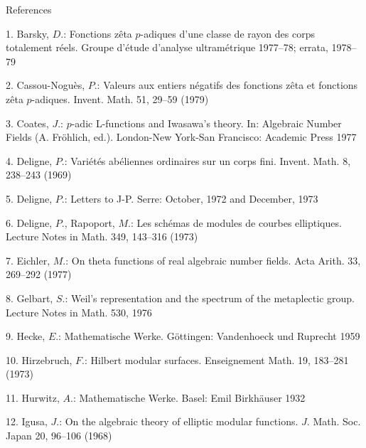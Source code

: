 \documentclass[11pt]{article}
\begin{document}
\par
\begingroup\small\setlength{\parskip}{.15\baselineskip}
References\par
\par
1. Barsky, \(D\).: Fonctions zêta \(p\)-adiques d’une classe de rayon des corps totalement réels. Groupe d’étude d’analyse ultramétrique 1977--78; errata, 1978--79\par
\par
2. Cassou-Noguès, \(P\).: Valeurs aux entiers négatifs des fonctions zêta et fonctions zêta \(p\)-adiques. Invent. Math. 51, 29--59 (1979)\par
\par
3. Coates, \(J\).: \(p\)-adic L-functions and Iwasawa’s theory. In: Algebraic Number Fields (A. Fröhlich, ed.). London-New York-San Francisco: Academic Press 1977\par
\par
4. Deligne, \(P\).: Variétés abéliennes ordinaires sur un corps fini. Invent. Math. 8, 238--243 (1969)\par
\par
5. Deligne, \(P\).: Letters to J-P. Serre: October, 1972 and December, 1973\par
\par
6. Deligne, \(P\)., Rapoport, \(M\).: Les schémas de modules de courbes elliptiques. Lecture Notes in Math. 349, 143--316 (1973)\par
\par
7. Eichler, \(M\).: On theta functions of real algebraic number fields. Acta Arith. 33, 269--292 (1977)\par
\par
8. Gelbart, \(S\).: Weil’s representation and the spectrum of the metaplectic group. Lecture Notes in Math. 530, 1976\par
\par
9. Hecke, \(E\).: Mathematische Werke. Göttingen: Vandenhoeck und Ruprecht 1959\par
\par
10. Hirzebruch, \(F\).: Hilbert modular surfaces. Enseignement Math. 19, 183--281 (1973)\par
\par
11. Hurwitz, \(A\).: Mathematische Werke. Basel: Emil Birkhäuser 1932\par
\par
12. Igusa, \(J\).: On the algebraic theory of elliptic modular functions. \(J\). Math. Soc. Japan 20, 96--106 (1968)\par
\par
\end{document}
